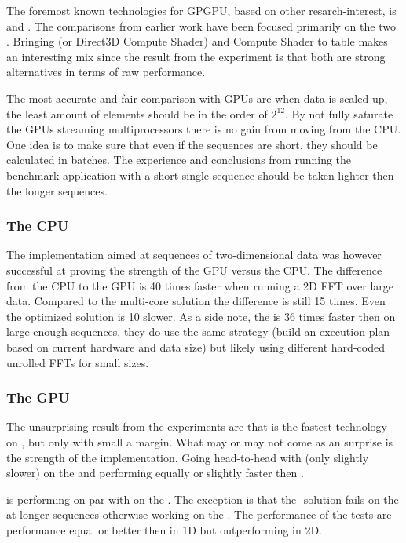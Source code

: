The foremost known technologies for GPGPU, based on other resarch-interest, is {\CU} and {\OCL}. The comparisons from earlier work have been focused primarily on the two \cite{fang2011comprehensive, park2011design, su2012overview}. Bringing {\DX} (or Direct3D Compute Shader) and {\GL} Compute Shader to table makes an interesting mix since the result from the experiment is that both are strong alternatives in terms of raw performance.

The most accurate and fair comparison with GPUs are when data is scaled up, the least amount of elements should be in the order of $2^{12}$. By not fully saturate the GPUs streaming multiprocessors there is no gain from moving from the CPU. One idea is to make sure that even if the sequences are short, they should be calculated in batches. The experience and conclusions from running the benchmark application with a short single sequence should be taken lighter then the longer sequences.

\subsubsection{The CPU}

The implementation aimed at sequences of two-dimensional data was however successful at proving the strength of the GPU versus the CPU. The difference from the CPU to the GPU is 40 times faster when running a 2D FFT over large data. Compared to the multi-core {\OMP} solution the difference is still 15 times. Even the optimized {\FFTW} solution is 10 slower. As a side note, the {\CUFFT} is 36 times faster then {\FFTW} on large enough sequences, they do use the same strategy (build an execution plan based on current hardware and data size) but likely using different hard-coded unrolled FFTs for small sizes.

\subsubsection{The GPU}

The unsurprising result from the experiments are that {\CU} is the fastest technology on {\NVCARD}, but only with small a margin. What may or may not come as an surprise is the strength of the {\DX} implementation. Going head-to-head with {\CU} (only slightly slower) on the {\NVCARD} and performing equally or slightly faster then {\OCL}.

{\GL} is performing on par with {\DX} on the {\AMDCARD}. The exception is that the {\GL}-solution fails on the {\AMDCARD} at longer sequences otherwise working on the {\NVCARD}. The performance of the {\GL} tests are performance equal or better then {\OCL} in 1D but outperforming {\OCL} in 2D.

